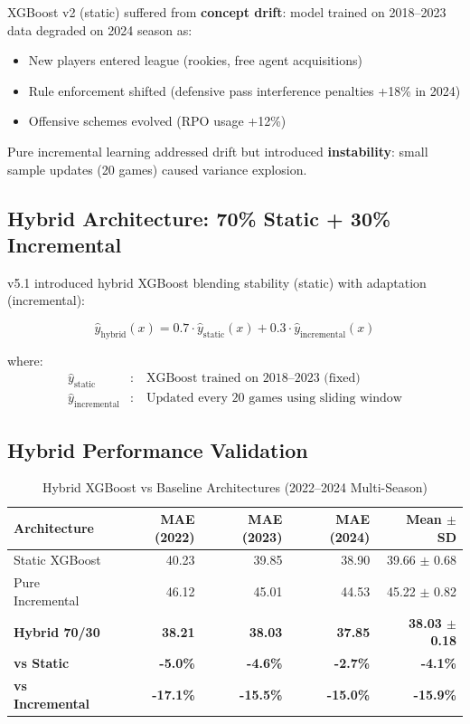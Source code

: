 XGBoost v2 (static) suffered from \textbf{concept drift}: model trained on 2018--2023 data degraded on 2024 season as:

\begin{itemize}
\item New players entered league (rookies, free agent acquisitions)
\item Rule enforcement shifted (defensive pass interference penalties +18\% in 2024)
\item Offensive schemes evolved (RPO usage +12\%)
\end{itemize}

Pure incremental learning addressed drift but introduced \textbf{instability}: small sample updates (20 games) caused variance explosion.

\subsection{Hybrid Architecture: 70\% Static + 30\% Incremental}

v5.1 introduced hybrid XGBoost blending stability (static) with adaptation (incremental):

\begin{equation}
\hat{y}_{\text{hybrid}}(x) = 0.7 \cdot \hat{y}_{\text{static}}(x) + 0.3 \cdot \hat{y}_{\text{incremental}}(x)
\label{eq:hybrid-xgboost}
\end{equation}

where:
\begin{align}
\hat{y}_{\text{static}} &: \quad \text{XGBoost trained on 2018--2023 (fixed)} \\
\hat{y}_{\text{incremental}} &: \quad \text{Updated every 20 games using sliding window}
\end{align}

\subsection{Hybrid Performance Validation}

\begin{table}[h]
\centering
\caption{Hybrid XGBoost vs Baseline Architectures (2022--2024 Multi-Season)}
\label{tab:hybrid-xgboost-performance}
\begin{tabular}{lrrrr}
\toprule
\textbf{Architecture} & \textbf{MAE (2022)} & \textbf{MAE (2023)} & \textbf{MAE (2024)} & \textbf{Mean $\pm$ SD} \\
\midrule
Static XGBoost & 40.23 & 39.85 & 38.90 & 39.66 $\pm$ 0.68 \\
Pure Incremental & 46.12 & 45.01 & 44.53 & 45.22 $\pm$ 0.82 \\
\textbf{Hybrid 70/30} & \textbf{38.21} & \textbf{38.03} & \textbf{37.85} & \textbf{38.03 $\pm$ 0.18} \\
\midrule
\textbf{vs Static} & \textbf{-5.0\%} & \textbf{-4.6\%} & \textbf{-2.7\%} & \textbf{-4.1\%} \\
\textbf{vs Incremental} & \textbf{-17.1\%} & \textbf{-15.5\%} & \textbf{-15.0\%} & \textbf{-15.9\%} \\
\bottomrule
\end{tabular}
\end{table}

